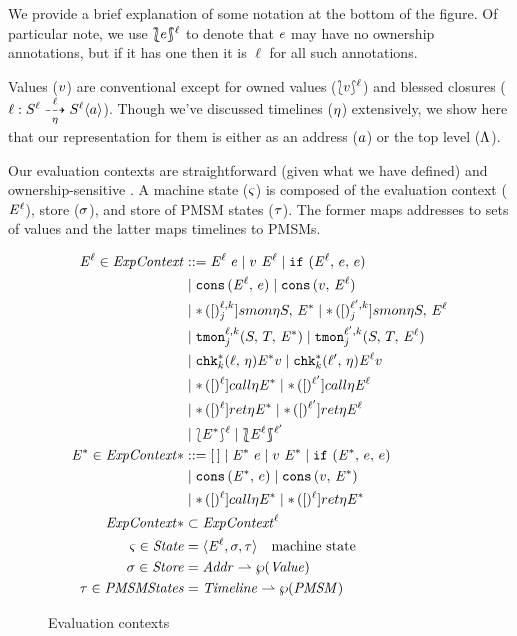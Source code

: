 %
\NB We provide a brief explanation of some notation at the bottom of the figure.
%
Of particular note, we use $\sOwn{\mexp}{\mmlab}$ to denote that $e$ may have no ownership annotations, but if it has one then it is $\ell$ for all such annotations.
%

%
Values ($v$) are conventional except for owned values ($\lbag v\rbag^{\ell}$) and blessed closures ($\ell : S^{\ell} \overset{\ell}{\underset{\eta}{\dashrightarrow}} S^{\ell} \langle a\rangle$).
%
Though we've discussed timelines ($\eta$) extensively, we show here that our representation for them is either as an address ($a$) or the top level ($\Lambda$).
%

%
Our evaluation contexts are straightforward (given what we have defined) and ownership-sensitive \cite{ianjohnson:dthf:complete}.
%
A machine state ($\varsigma$) is composed of the evaluation context ($\mathit{E}^{\ell}$), store ($\sigma$), and store of PMSM states ($\tau$).
%
The former maps addresses to sets of values and the latter maps timelines to PMSMs.
%

\begin{figure}
\begin{align*}
\mctx{\mmlab} \in \ECtx &::=
      \sapp{\mctx{\mmlab}}{\mexp}
 \alt \sapp{\mval}{\mctx{\mmlab}}
 \alt \sif{\mctx{\mmlab}}{\mexp}{\mexp} \\
&\alt \vcons{\mctx{\mmlab}}{\mexp}
 \alt \vcons{\mval}{\mctx{\mmlab}} \\
&\alt \sSMon{\ell}{k}{j}{\mtimeline}{\mscon}{\mctx*}
 \alt \sSMon{\ell^\prime}{k}{j}{\mtimeline}{\mscon}{\mctx{\ell}} \\
&\alt \sTMon{\ell}{k}{j}{\mscon}{\mtcon}{\mctx*}
 \alt \sTMon{\ell^\prime}{k}{j}{\mscon}{\mtcon}{\mctx{\ell}} \\
&\alt \schk*{k}{\ell}{\mtimeline}{\mctx*}{\mval}
 \alt \schk*{k}{\ell^\prime}{\mtimeline}{\mctx{\ell}}{\mval} \\
&\alt \scall{\ell}{\mtimeline}{\mctx*}
 \alt \scall{\ell^\prime}{\mtimeline}{\mctx{\ell}} \\
&\alt \sret{\ell}{\mtimeline}{\mctx*}
 \alt \sret{\ell^\prime}{\mtimeline}{\mctx{\ell}} \\
&\alt \sown{\mctx*}{\ell}
 \alt \sOwn{\mctx{\ell}}{\ell^\prime}
\\
\mctx* \in \ECtx* &::=
      \hole
 \alt \sapp{\mctx*}{\mexp}
 \alt \sapp{\mval}{\mctx*}
 \alt \sif{\mctx*}{\mexp}{\mexp} \\
&\alt \vcons{\mctx*}{\mexp}
 \alt \vcons{\mval}{\mctx*} \\
&\alt \scall{\mmlab}{\mtimeline}{\mctx*}
 \alt \sret{\mmlab}{\mtimeline}{\mctx*} \\
\ECtx* &\subset \ECtx^\mmlab
\\
\mstate \in \State &= \angle{\mctx{\mmlab}, \msto, \mTMons} \quad\text{machine state}
\\
\msto \in \Store &= \Addr \parto \wp(\Value)
\\
\mTMons \in \TMons &= \Timeline \parto \wp(\PMSM)
\end{align*}
\caption{Evaluation contexts}
\label{fig:ctx}
\end{figure}

